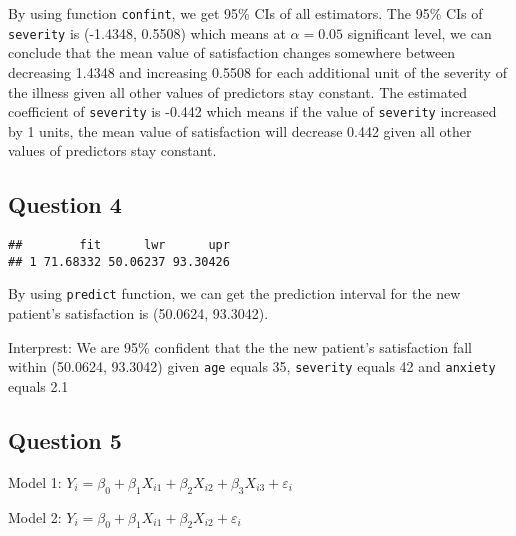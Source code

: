 \documentclass[]{article}
\newenvironment{Shaded}{\begin{snugshade}}{\end{snugshade}}
\newcommand{\KeywordTok}[1]{\textcolor[rgb]{0.13,0.29,0.53}{\textbf{#1}}}
\newcommand{\DataTypeTok}[1]{\textcolor[rgb]{0.13,0.29,0.53}{#1}}
\newcommand{\DecValTok}[1]{\textcolor[rgb]{0.00,0.00,0.81}{#1}}
\newcommand{\FloatTok}[1]{\textcolor[rgb]{0.00,0.00,0.81}{#1}}
\newcommand{\StringTok}[1]{\textcolor[rgb]{0.31,0.60,0.02}{#1}}
\newcommand{\OperatorTok}[1]{\textcolor[rgb]{0.81,0.36,0.00}{\textbf{#1}}}
\newcommand{\NormalTok}[1]{#1}
\begin{document}
By using function \texttt{confint}, we get 95\% CIs of all estimators.
The 95\% CIs of \texttt{severity} is (-1.4348, 0.5508) which means at
\(\alpha = 0.05\) significant level, we can conclude that the mean value
of satisfaction changes somewhere between decreasing 1.4348 and
increasing 0.5508 for each additional unit of the severity of the
illness given all other values of predictors stay constant. The
estimated coefficient of \texttt{severity} is -0.442 which means if the
value of \texttt{severity} increased by 1 units, the mean value of
satisfaction will decrease 0.442 given all other values of predictors
stay constant.

\subsection{Question 4}\label{question-4-1}

\begin{Shaded}
\end{Shaded}

\begin{verbatim}
##        fit      lwr      upr
## 1 71.68332 50.06237 93.30426
\end{verbatim}

By using \texttt{predict} function, we can get the prediction interval
for the new patient's satisfaction is (50.0624, 93.3042).

Interprest: We are 95\% confident that the the new patient's
satisfaction fall within (50.0624, 93.3042) given \texttt{age} equals
35, \texttt{severity} equals 42 and \texttt{anxiety} equals 2.1

\subsection{Question 5}\label{question-5-1}

Model 1:
\(Y_i = \beta_0 + \beta_1X_{i1} + \beta_2X_{i2} + \beta_3X_{i3} + \varepsilon_i\)

Model 2:
\(Y_i = \beta_0 + \beta_1X_{i1} + \beta_2X_{i2} + \varepsilon_i\)
\end{document}
